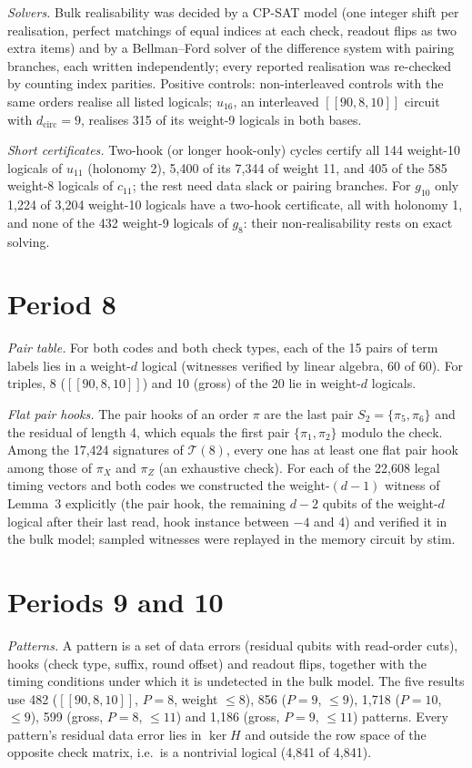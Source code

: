 \documentclass[aps,prl,twocolumn,superscriptaddress,nofootinbib]{revtex4-2}
\newif\ifshowclaimtags \showclaimtagsfalse
\newcommand{\cl}[1]{\ifshowclaimtags\textsuperscript{\textcolor{blue}{\scriptsize[#1]}}\fi}
\newcommand{\dcirc}{d_{\mathrm{circ}}}
\newcommand{\code}[1]{[[#1]]}
\newcommand{\T}{\mathcal{T}}
\begin{document}
\emph{Solvers.} Bulk realisability was decided by a CP-SAT model (one integer shift per
realisation, perfect matchings of equal indices at each check, readout flips as two extra
items) and by a Bellman--Ford solver of the difference system with pairing branches, each
written independently; every reported realisation was re-checked by counting index
parities. Positive controls: non-interleaved controls with the same orders realise all
listed logicals; $u_{16}$, an interleaved $\code{90,8,10}$ circuit with $\dcirc=9$,
realises 315 of its weight-9 logicals in both bases.

\emph{Short certificates.} Two-hook (or longer hook-only) cycles certify all 144 weight-10
logicals of $u_{11}$ (holonomy 2), 5,400 of its 7,344 of weight 11, and 405 of the 585
weight-8 logicals of $c_{11}$; the rest need data slack or pairing branches. For $g_{10}$
only 1,224 of 3,204 weight-10 logicals have a two-hook certificate, all with holonomy 1,
and none of the 432 weight-9 logicals of $g_8$: their non-realisability rests on exact
solving.

\section{Period 8}\label{sm:p8}\cl{L-12}
\emph{Pair table.} For both codes and both check types, each of the 15 pairs of term labels
lies in a weight-$d$ logical (witnesses verified by linear algebra, 60 of 60). For triples,
8 ($\code{90,8,10}$) and 10 (gross) of the 20 lie in weight-$d$ logicals.

\emph{Flat pair hooks.} The pair hooks of an order $\pi$ are the last pair
$S_2=\{\pi_5,\pi_6\}$ and the residual of length 4, which equals the first pair
$\{\pi_1,\pi_2\}$ modulo the check. Among the 17,424 signatures of $\T(8)$, every one has at
least one flat pair hook among those of $\pi_X$ and $\pi_Z$ (an exhaustive check). For each
of the 22,608 legal timing vectors and both codes we constructed the weight-$(d-1)$ witness
of Lemma~3 explicitly (the pair hook, the remaining $d-2$ qubits of the weight-$d$ logical
after their last read, hook instance between $-4$ and 4) and verified it in the bulk model;
sampled witnesses were replayed in the memory circuit by stim.

\section{Periods 9 and 10}\label{sm:p910}\cl{L-2,L-15}
\emph{Patterns.} A pattern is a set of data errors (residual qubits with read-order cuts),
hooks (check type, suffix, round offset) and readout flips, together with the timing
conditions under which it is undetected in the bulk model. The five results use 482
($\code{90,8,10}$, $P=8$, weight $\le8$), 856 ($P=9$, $\le9$), 1,718 ($P=10$, $\le9$), 599
(gross, $P=8$, $\le11$) and 1,186 (gross, $P=9$, $\le11$) patterns. Every pattern's residual
data error lies in $\ker H$ and outside the row space of the opposite check matrix, i.e.\ is
a nontrivial logical (4,841 of 4,841).
\end{document}

